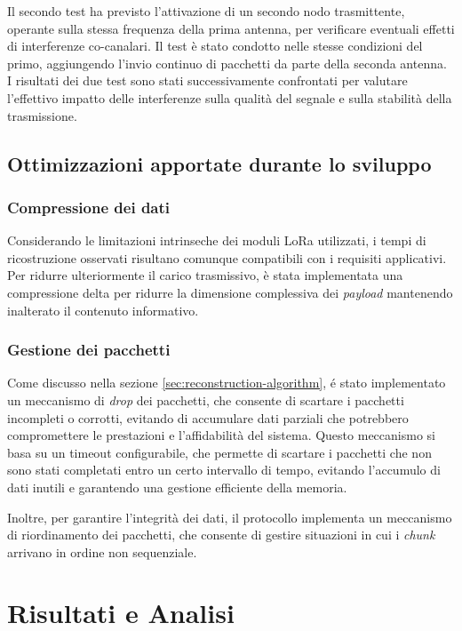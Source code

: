 \documentclass[12pt,a4paper,twoside]{book}
\begin{document}
Il secondo test ha previsto l'attivazione di un secondo nodo trasmittente,
operante sulla stessa frequenza della prima antenna, per verificare eventuali effetti
di interferenze co-canalari. Il test è stato condotto nelle stesse condizioni del primo,
aggiungendo l'invio continuo di pacchetti da parte della seconda antenna.
I risultati dei due test sono stati successivamente confrontati per valutare l'effettivo impatto
delle interferenze sulla qualità del segnale e sulla stabilità della trasmissione.

\section{Ottimizzazioni apportate durante lo sviluppo}
\subsection{Compressione dei dati}
Considerando le limitazioni intrinseche dei moduli \ac{LoRa} utilizzati,
i tempi di ricostruzione osservati risultano comunque compatibili con i requisiti applicativi.
Per ridurre ulteriormente il carico trasmissivo, è stata implementata una compressione
delta per ridurre la dimensione complessiva dei \emph{payload} mantenendo inalterato il contenuto informativo.
\subsection{Gestione dei pacchetti}
Come discusso nella sezione \ref{sec:reconstruction-algorithm}, \'e stato implementato
un meccanismo di \emph{drop} dei pacchetti, che consente di scartare i pacchetti
incompleti o corrotti, evitando di accumulare dati parziali che potrebbero compromettere
le prestazioni e l'affidabilità del sistema.
Questo meccanismo si basa su un timeout configurabile, che permette di scartare i pacchetti
che non sono stati completati entro un certo intervallo di tempo, evitando l'accumulo
di dati inutili e garantendo una gestione efficiente della memoria.

Inoltre, per garantire l'integrità dei dati, il protocollo implementa un meccanismo di riordinamento
dei pacchetti, che consente di gestire situazioni in cui i \emph{chunk} arrivano
in ordine non sequenziale.

\chapter{Risultati e Analisi} \label{chap:results}
\end{document}

